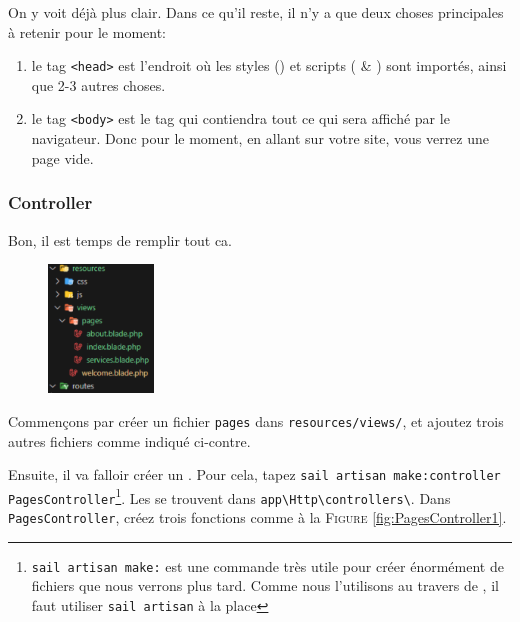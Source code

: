 On y voit déjà plus clair. Dans ce qu'il reste, il n'y a que deux choses principales à retenir pour le moment: 
\begin{enumerate}
    \item le tag \verb|<head>| est l'endroit où les styles (\css{}) et scripts (\jquery{}  \& \js{}) sont importés, ainsi que 2-{}3 autres choses.
    \item le tag \verb|<body>| est le tag qui contiendra tout ce qui sera affiché par le navigateur. Donc pour le moment, en allant sur votre site, vous verrez une page vide.
\end{enumerate}

\subsubsection[Controller][laravel.com/docs/10.x/controllers\#introduction]{Controller}

Bon, il est temps de remplir tout ca.

\begin{figure}
    \vspace{-0.5cm}
    \includegraphics[width=0.25\textwidth]{figures-C1/3_premieres_views.pdf}
\end{figure}

Commençons par créer un fichier \verb|pages| dans \verb|resources/views/|, et ajoutez trois autres fichiers comme indiqué ci-contre.

Ensuite, il va falloir créer un \controller{}. Pour cela, tapez
\verb|sail artisan make:controller PagesController|\footnote{\verb|sail artisan make:| est une commande très utile pour créer énormément de fichiers que nous verrons plus tard. Comme nous l'utilisons au travers de \laravelsail, il faut utiliser \verb|sail artisan| à la place}. \linebreak Les \controllers{} se trouvent dans \verb|app\Http\controllers\|. Dans \verb|PagesController|, créez trois fonctions comme à la \textsc{Figure }\ref{fig:PagesController1}.

